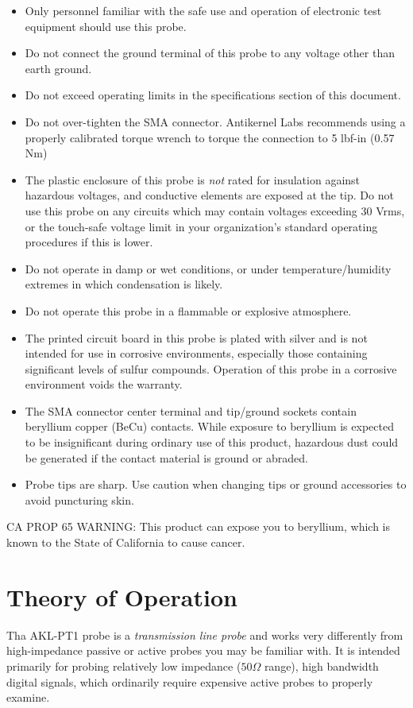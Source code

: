 \documentclass[11pt]{article}
\begin{document}
\begin{itemize}
\item Only personnel familiar with the safe use and operation of electronic test equipment should use this probe.
\item Do not connect the ground terminal of this probe to any voltage other than earth ground.
\item Do not exceed operating limits in the specifications section of this document.
\item Do not over-tighten the SMA connector. Antikernel Labs recommends using a properly calibrated torque wrench to
torque the connection to 5 lbf-in (0.57 Nm)
\item The plastic enclosure of this probe is \emph{not} rated for insulation against hazardous voltages, and conductive
elements are exposed at the tip. Do not use this probe on any circuits which may contain voltages exceeding 30 Vrms, or
the touch-safe voltage limit in your organization's standard operating procedures if this is lower.
\item Do not operate in damp or wet conditions, or under temperature/humidity extremes in which condensation is
likely.
\item Do not operate this probe in a flammable or explosive atmosphere.
\item The printed circuit board in this probe is plated with silver and is not intended for use in corrosive environments,
especially those containing significant levels of sulfur compounds. Operation of this probe in a corrosive environment
voids the warranty.
\item  The SMA connector center terminal and tip/ground sockets contain beryllium copper (BeCu) contacts. While exposure to
beryllium is expected to be insignificant during ordinary use of this product, hazardous dust could be generated if the
contact material is ground or abraded.
\item Probe tips are sharp. Use caution when changing tips or ground accessories to avoid puncturing skin.
\end{itemize}

CA PROP 65 WARNING: This product can expose you to beryllium, which is known to the State of California to cause cancer.

\pagebreak
\section{Theory of Operation}

Tha AKL-PT1 probe is a \emph{transmission line probe} and works very differently from high-impedance passive or active
probes you may be familiar with. It is intended primarily for probing relatively low impedance ($50 \Omega$ range),
high bandwidth digital signals, which ordinarily require expensive active probes to properly examine.
\end{document}
